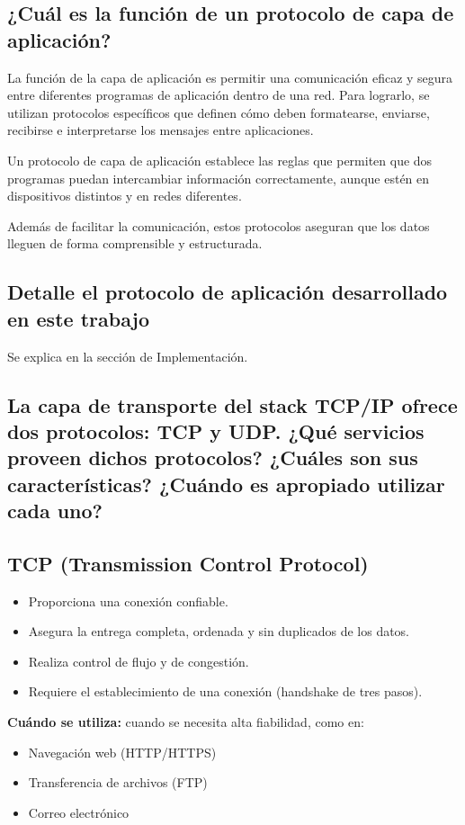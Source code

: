 \documentclass[a4paper,10pt]{article}
\begin{document}
\subsection{¿Cuál es la función de un protocolo de capa de aplicación?}
La función de la capa de aplicación es permitir una comunicación eficaz y segura entre diferentes programas de aplicación dentro de una red. Para lograrlo, se utilizan protocolos específicos que definen cómo deben formatearse, enviarse, recibirse e interpretarse los mensajes entre aplicaciones.

Un protocolo de capa de aplicación establece las reglas que permiten que dos programas puedan intercambiar información correctamente, aunque estén en dispositivos distintos y en redes diferentes.

Además de facilitar la comunicación, estos protocolos aseguran que los datos lleguen de forma comprensible y estructurada.

\subsection{Detalle el protocolo de aplicación desarrollado en este trabajo}
Se explica en la sección de Implementación.

\subsection{La capa de transporte del stack TCP/IP ofrece dos protocolos: TCP y UDP. ¿Qué servicios proveen dichos protocolos? ¿Cuáles son sus características? ¿Cuándo es apropiado utilizar cada uno?}

\subsection*{TCP (Transmission Control Protocol)}

\begin{itemize}
    \item Proporciona una conexión confiable.
    \item Asegura la entrega completa, ordenada y sin duplicados de los datos.
    \item Realiza control de flujo y de congestión.
    \item Requiere el establecimiento de una conexión (handshake de tres pasos).
\end{itemize}

\textbf{Cuándo se utiliza:} cuando se necesita alta fiabilidad, como en:
\begin{itemize}
    \item Navegación web (HTTP/HTTPS)
    \item Transferencia de archivos (FTP)
    \item Correo electrónico
\end{itemize}
\end{document}
